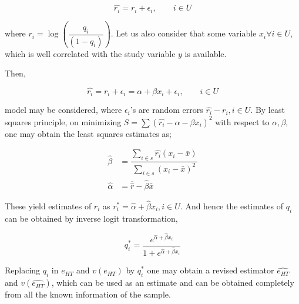 \documentclass[12pt]{article}
\theoremstyle{definition}
\begin{document}
$$\widehat{r_i} = r_i + \epsilon_i, \qquad i \in U$$

where $r_i = \log\left( \dfrac{q_i}{(1 - q_i)} \right)$. Let us also consider that some variable $x_i \forall i \in U$, which is well correlated with the study variable $y$ is available.

Then,

$$\widehat{r_i} = r_i + \epsilon_i = \alpha + \beta x_i + \epsilon_i, \qquad i \in U$$

model may be considered, where $\epsilon_i$'s are random errors $\widehat{r_i} - r_i, i \in U$. By least squares principle, on minimizing $S = \sum (\hat{r_i} - \alpha - \beta x_i)^2$ with respect to $\alpha, \beta$, one may obtain the least squares estimates as;

\begin{align*}
    \widehat{\beta} & = \dfrac{\sum_{i \in s} \hat{r_i} (x_i - \bar{x}) }{ \sum_{i \in s} (x_i - \bar{x})^2 }\\
    \widehat{\alpha} & = \overline{\widehat{r}} - \widehat{\beta}\bar{x}
\end{align*}


These yield estimates of $r_i$ as $r_i^\ast = \widehat{\alpha} + \widehat{\beta}x_i, i \in U$. And hence the estimates of $q_i$ can be obtained by inverse logit transformation,

$$q_i^\ast = \dfrac{e^{\widehat{\alpha} + \widehat{\beta}x_i }}{1 + e^{\widehat{\alpha} + \widehat{\beta}x_i } }$$

Replacing $q_i$ in $e_{HT}$ and $v(e_{HT})$ by $q_i^\ast$ one may obtain a revised estimator $\widehat{e_{HT}}$ and $v(\widehat{e_{HT}})$, which can be used as an estimate and can be obtained completely from all the known information of the sample.
\end{document}
